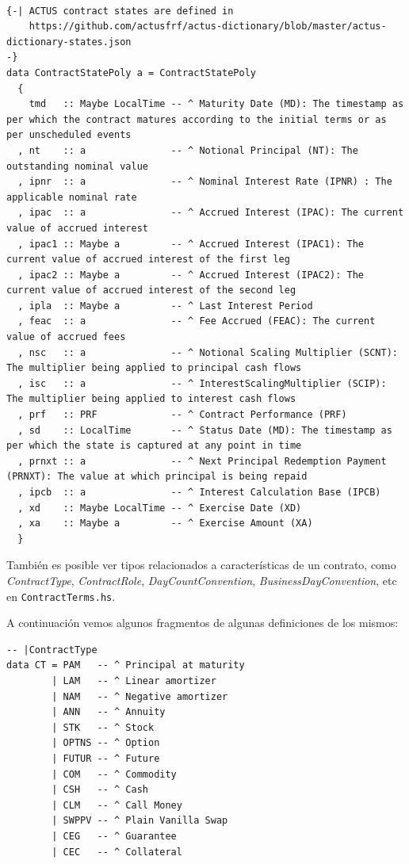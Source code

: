 \documentclass[12pt]{book}
\begin{document}
\begin{lstlisting}[style=Haskell-cardano, caption=Contract state poly.]

{-| ACTUS contract states are defined in
    https://github.com/actusfrf/actus-dictionary/blob/master/actus-dictionary-states.json
-}
data ContractStatePoly a = ContractStatePoly
  {
    tmd   :: Maybe LocalTime -- ^ Maturity Date (MD): The timestamp as per which the contract matures according to the initial terms or as per unscheduled events
  , nt    :: a               -- ^ Notional Principal (NT): The outstanding nominal value
  , ipnr  :: a               -- ^ Nominal Interest Rate (IPNR) : The applicable nominal rate
  , ipac  :: a               -- ^ Accrued Interest (IPAC): The current value of accrued interest
  , ipac1 :: Maybe a         -- ^ Accrued Interest (IPAC1): The current value of accrued interest of the first leg
  , ipac2 :: Maybe a         -- ^ Accrued Interest (IPAC2): The current value of accrued interest of the second leg
  , ipla  :: Maybe a         -- ^ Last Interest Period
  , feac  :: a               -- ^ Fee Accrued (FEAC): The current value of accrued fees
  , nsc   :: a               -- ^ Notional Scaling Multiplier (SCNT): The multiplier being applied to principal cash flows
  , isc   :: a               -- ^ InterestScalingMultiplier (SCIP): The multiplier being applied to interest cash flows
  , prf   :: PRF             -- ^ Contract Performance (PRF)
  , sd    :: LocalTime       -- ^ Status Date (MD): The timestamp as per which the state is captured at any point in time
  , prnxt :: a               -- ^ Next Principal Redemption Payment (PRNXT): The value at which principal is being repaid
  , ipcb  :: a               -- ^ Interest Calculation Base (IPCB)
  , xd    :: Maybe LocalTime -- ^ Exercise Date (XD)
  , xa    :: Maybe a         -- ^ Exercise Amount (XA)
  }
\end{lstlisting}


También es posible ver tipos relacionados a características de un contrato, como \textit{ContractType}, \textit{ContractRole}, \textit{DayCountConvention}, \textit{BusinessDayConvention}, etc en \texttt{ContractTerms.hs}.

A continuación vemos algunos fragmentos de algunas definiciones de los mismos:

\begin{lstlisting}[style=Haskell-cardano, caption=Tipos de contrato.]
-- |ContractType
data CT = PAM   -- ^ Principal at maturity
        | LAM   -- ^ Linear amortizer
        | NAM   -- ^ Negative amortizer
        | ANN   -- ^ Annuity
        | STK   -- ^ Stock
        | OPTNS -- ^ Option
        | FUTUR -- ^ Future
        | COM   -- ^ Commodity
        | CSH   -- ^ Cash
        | CLM   -- ^ Call Money
        | SWPPV -- ^ Plain Vanilla Swap
        | CEG   -- ^ Guarantee
        | CEC   -- ^ Collateral
\end{lstlisting}
\end{document}
